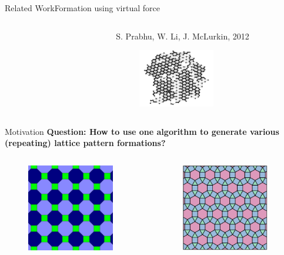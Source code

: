 \begin{frame}{Related Work}{Formation using virtual force}
\begin{columns}[T]
\begin{column}{.45\textwidth}
\begin{figure}
      \end{figure}  
    \end{column}%
    \begin{column}{.45\textwidth}
      \scriptsize{S. Prabhu, W. Li, J. McLurkin, 2012}
      \begin{figure}
        \centering
        \includegraphics[height=1in]{figs/james.png}
      \end{figure}
    \end{column}
  \end{columns}
\end{frame}

\begin{frame}{Motivation}{}
  \textbf{Question: How to use one algorithm to generate
      various (repeating) lattice pattern formations?}
    \begin{columns}
    \begin{column}{.45\textwidth}
      \begin{figure}
        \centering
        \includegraphics[height=1.5in]{figs/tessellation2.png}
      \end{figure}
    \end{column}
    \begin{column}{.45\textwidth}
       \begin{figure}
         \centering
        \includegraphics[height=1.5in]{figs/tessellation1.png}
      \end{figure}
    \end{column}
  \end{columns} 
\end{frame}

